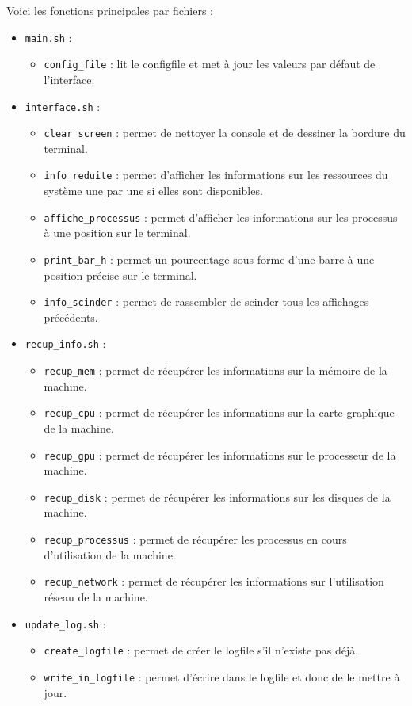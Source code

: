 \documentclass{article}
\begin{document}
Voici les fonctions principales par fichiers :
\begin{itemize}
    \item \texttt{main.sh} :
        \begin{itemize}
            \item \texttt{config\_file} : lit le configfile et met à jour les valeurs par défaut de l'interface.
        \end{itemize}
    \vspace{0.3em}
    \item \texttt{interface.sh} :
        \begin{itemize}
            \item {\texttt{clear\_screen}} : permet de nettoyer la console et de dessiner la bordure du terminal.
            \item \texttt{info\_reduite} : permet d'afficher les informations sur les ressources du système une par une si elles sont disponibles.
            \item \texttt{affiche\_processus} : permet d'afficher les informations sur les processus à une position sur le terminal.
            \item \texttt{print\_bar\_h} : permet un pourcentage sous forme d'une barre à une position précise sur le terminal.
            \item \texttt{info\_scinder} : permet de rassembler de scinder tous les affichages précédents.
        \end{itemize}
        \vspace{0.3em}
    \item \texttt{recup\_info.sh} :
        \begin{itemize}
            \item \texttt{recup\_mem} : permet de récupérer les informations sur la mémoire de la machine.
            \item \texttt{recup\_cpu} : permet de récupérer les informations sur la carte graphique de la machine.
            \item \texttt{recup\_gpu} : permet de récupérer les informations sur le processeur de la machine.
            \item \texttt{recup\_disk} : permet de récupérer les informations sur les disques de la machine.
            \item \texttt{recup\_processus} : permet de récupérer les processus en cours d'utilisation de la machine.
            \item \texttt{recup\_network} : permet de récupérer les informations sur l'utilisation réseau de la machine.
        \end{itemize}
        \vspace{0.3em}
    \item \texttt{update\_log.sh} :
        \begin{itemize}
            \item \texttt{create\_logfile} : permet de créer le logfile s'il n'existe pas déjà.
            \item \texttt{write\_in\_logfile} : permet d'écrire dans le logfile et donc de le mettre à jour.
        \end{itemize}
\end{itemize}
\end{document}

